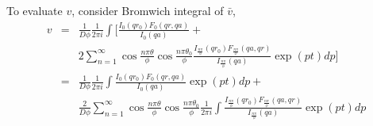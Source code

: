 \documentclass{article}
\begin{document}
To evaluate $v$, consider Bromwich integral of $\bar{v}$, 
\begin{eqnarray}
    v &=& \frac{1}{D\phi}\frac{1}{2\pi i}\int
    \Biggl[ \frac{I_0(qr_0)F_0(qr, qa)}{I_0(qa)} + \nonumber\\
      & &  2\sum^{\infty}_{n=1}
           \cos\frac{n\pi\theta}{\phi}\cos\frac{n\pi\theta_0}{\phi}
           \frac{I_{\frac{n\pi}{\phi}}(qr_0)F_{\frac{n\pi}{\phi}}(qa, qr)}
           {I_{\frac{n\pi}{\phi}}(qa)}\exp(pt)dp\Biggr] \nonumber \\
      &=&  \frac{1}{D\phi}\frac{1}{2\pi i}\int
           \frac{I_0(qr_0)F_0(qr, qa)}{I_0(qa)}\exp(pt)dp +\nonumber\\
      & &  \frac{2}{D\phi}\sum^{\infty}_{n=1}
           \cos\frac{n\pi\theta}{\phi}\cos\frac{n\pi\theta_0}{\phi}
           \frac{1}{2\pi i}\int
           \frac{I_{\frac{n\pi}{\phi}}(qr_0)F_{\frac{n\pi}{\phi}}(qa, qr)}
           {I_{\frac{n\pi}{\phi}}(qa)}\exp(pt)dp
    \label{v-bromwich-integral-form}
\end{eqnarray}
\end{document}
